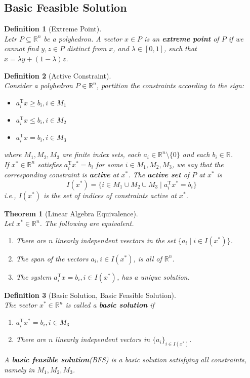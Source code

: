 \documentclass[12pt]{article}
\newcommand{\T}{\mathrm{T}}
\newtheorem{definition}{Definition}[section]
\newtheorem{theorem}{Theorem}[section]
\theoremstyle{definition}
\begin{document}
\subsection{Basic Feasible Solution}
\begin{definition}[Extreme Point]
\hfill\\\normalfont Letr $P\subseteq \mathbb{R}^n$ be a polyhedron. A vector $x\in P$ is an \textbf{extreme point} of $P$ if we cannot find $y,z\in P$ distinct from $x$, and $\lambda\in[0,1]$, such that $x=\lambda y+(1-\lambda)z$.
\end{definition}
\begin{definition}[Active Constraint]
\hfill\\\normalfont 
Consider a polyhedron $P\in\mathbb{R}^n$, partition the constraints according to the sign:
\begin{itemize}
  \item $a_i^\T x\geq b_i, i\in M_1$
  \item $a_i^\T x\leq b_i, i\in M_2$
  \item $a_i^\T x= b_i, i\in M_3$
\end{itemize}
where $M_1, M_2, M_3$ are finite index sets, each $a_i\in\mathbb{R}^n\setminus\{0\}$ and each $b_i\in \mathbb{R}$.\\
If $x^\ast\in\mathbb{R}^n$ satisfies $a_i^\T x^\ast = b_i$ for some $i\in M_1, M_2, M_3$, we say that the corresponding constraint is \textbf{active} at $x^\ast$. The \textbf{active set} of $P$ at $x^\ast$ is
\[
I(x^\ast) = \{i\in M_1\cup M_2\cup M_3\mid a_i^\T x^\ast = b_i\}
\]
i.e., $I(x^\ast)$ is the set of indices of constraints active at $x^\ast$.
\end{definition}
\begin{theorem}[Linear Algebra Equivalence]
\hfill\\\normalfont Let $x^\ast \in \mathbb{R}^n$. The following are equivalent.
\begin{enumerate}
	\item There are $n$ linearly independent veectors in the set $\{a_i\mid i\in I(x^\ast)\}$.
	\item The span of the vectors $a_i, i\in I(x^\ast)$, is all of $\mathbb{R}^n$.
	\item The system $a_i^\T x=b_i, i\in I(x^\ast)$, has a unique solution.
\end{enumerate}
\end{theorem}
\begin{definition}[Basic Solution, Basic Feasible Solution]
\hfill\\\normalfont The vector $x^\ast\in\mathbb{R}^n$ is called a \textbf{basic solution} if
\begin{enumerate}
	\item $a_i^\T x^\ast = b_i, i\in M_3$
	\item There are $n$ linearly independent vectors in $\{a_i\}_{i\in I(x^\ast)}$.
\end{enumerate}
A \textbf{basic feasible solution}(BFS) is a basic solution satisfying all constraints, namely in $M_1, M_2, M_3$.
\end{definition}
\end{document}
